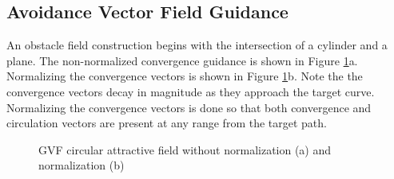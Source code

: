 \documentclass[numbered,pdftex]{ohio-etd}
\begin{document}
\subsection{Avoidance Vector Field Guidance}
An obstacle field construction begins with the intersection of a cylinder and a plane. The non-normalized convergence guidance is shown in Figure \ref{fig:gvfCircAttractive}a. Normalizing the convergence vectors is shown in Figure \ref{fig:gvfCircAttractive}b. Note the the convergence vectors decay in magnitude as they approach the target curve. Normalizing the convergence vectors is done so that both convergence and circulation vectors are present at any range from the target path.

\begin{figure}[H]
	\begin{subfigmatrix}{2}%
		\centering	
		\hspace*{0mm}
	\end{subfigmatrix}
	\caption{GVF circular attractive field without normalization (a) and normalization (b)}
	\label{fig:gvfCircAttractive}
\end{figure}
\end{document}
